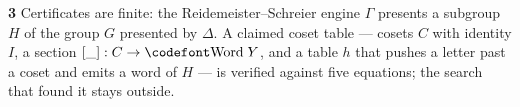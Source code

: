 \begin{frame}{\textbf{3}\; Certificates are finite: the Reidemeister--Schreier engine}
\small $\Gamma$ presents a subgroup $H$ of the group $G$ presented by $\Delta$.
A \alert{claimed} coset table --- cosets $C$ with identity $I$, a section
$[\_] : C\to\aid{Word}\;Y$, and a table $h$ that pushes a letter past a coset and
emits a word of $H$ --- is \alert{verified} against five equations; the search
that found it stays outside.
\vspace{4pt}

\renewcommand{\AgdaCodeStyle}{\scriptsize}
\begin{code}%
\>[0]\AgdaSpace{}%
\<%
\\
\>[0][@{}l@{\AgdaIndent{0}}]%
\>[2]\AgdaSymbol{(}\AgdaSpace{}%
\AgdaSymbol{:}\AgdaSpace{}%
\AgdaSpace{}%
\AgdaSymbol{(}\AgdaSpace{}%
\AgdaSymbol{:}\AgdaSpace{}%
\AgdaSymbol{)}\AgdaSpace{}%
\AgdaSpace{}%
\AgdaSymbol{(}\AgdaOperator{\AgdaInductiveConstructor{[}}\AgdaSpace{}%
\AgdaSpace{}%
\AgdaOperator{\AgdaInductiveConstructor{]ʷ}}\AgdaSpace{}%
\AgdaOperator{\AgdaInductiveConstructor{,}}\AgdaSpace{}%
\AgdaSymbol{)}\AgdaSpace{}%
\AgdaOperator{\AgdaPostulate{\textasciitilde{}}}\AgdaSpace{}%
\AgdaSymbol{((}\AgdaSpace{}%
\AgdaSymbol{)}\AgdaSpace{}%
\AgdaSpace{}%
\AgdaSymbol{(}\AgdaSpace{}%
\AgdaSymbol{)))}%
\>[83]\<%
\\
%
\>[2]\AgdaSymbol{(}\AgdaSpace{}%
\AgdaSymbol{:}\AgdaSpace{}%
\AgdaSpace{}%
\AgdaSymbol{(}\AgdaSpace{}%
\AgdaSymbol{:}\AgdaSpace{}%
\AgdaSymbol{)\{}\AgdaSpace{}%
\AgdaSpace{}%
\AgdaSymbol{:}\AgdaSpace{}%
\AgdaSpace{}%
\AgdaSymbol{\}}\AgdaSpace{}%
\AgdaSpace{}%
\AgdaSpace{}%
\AgdaSpace{}%
\AgdaSpace{}%
\AgdaSpace{}%
\AgdaSymbol{((}\AgdaSpace{}%
\AgdaSymbol{)}\AgdaSpace{}%
\AgdaSpace{}%
\AgdaSymbol{)}\AgdaSpace{}%
\AgdaOperator{\AgdaPostulate{\textasciitilde{}}}\AgdaSpace{}%
\AgdaSymbol{((}\AgdaSpace{}%
\AgdaSymbol{)}\AgdaSpace{}%
\AgdaSpace{}%
\AgdaSymbol{))}%
\>[83]\<%

\end{code}
\end{frame}
